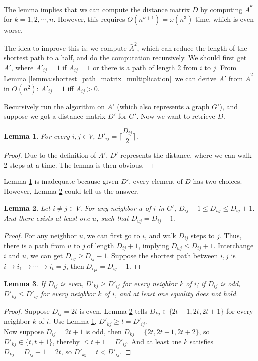 \documentclass[12pt]{article}
\theoremstyle{plain}
\newtheorem{lemma}{Lemma}[section]
\begin{document}
The lemma implies that we can compute the distance matrix $D$ by computing $\bar{A}^k$ for $k=1,2,\cdots,n$. However, this requires $O(n^{\nu+1})=\omega(n^3)$ time, which is even worse.

The idea to improve this is: we compute $\bar A^2$, which can reduce the length of the shortest path to a half, and do the computation recursively. We should first get $A'$, where $A'_{ij}=1$ if $A_{ij}=1$ or there is a path of length 2 from $i$ to $j$. From Lemma \ref{lemma:shortest_path_matrix_multiplication}, we can derive $A'$ from $\bar A^2$ in $O(n^2)$: $A'_{ij}=1$ iff $\bar A_{ij}>0$.

Recursively run the algorithm on $A'$ (which also represents a graph $G'$), and suppose we got a distance matrix $D'$ for $G'$. Now we want to retrieve $D$.

\begin{lemma}
\label{2}
For every $i,j\in V$, $D'_{ij}=\lceil\dfrac{D_{ij}}{2}\rceil$.
\end{lemma}
\begin{proof}
Due to the definition of $A'$, $D'$ represents the distance, where we can walk 2 steps at a time. The lemma is then obvious.
\end{proof}

Lemma \ref{2} is inadequate because given $D'$, every element of $D$ has two choices. However, Lemma \ref{3} could tell us the answer.
\begin{lemma}
\label{3}
Let $i\not=j \in V$. For any neighbor $u$ of $i$ in $G'$, $D_{ij}-1\le D_{uj}\le D_{ij}+1$. And there exists at least one $u$, such that $D_{uj}=D_{ij}-1$.
\end{lemma}
\begin{proof}
For any neighbor $u$, we can first go to $i$, and walk $D_{ij}$ steps to $j$. Thus, there is a path from $u$ to $j$ of length $D_{ij}+1$, implying $D_{uj}\le D_{ij}+1$. Interchange $i$ and $u$, we can get $D_{uj}\ge D_{ij}-1$. Suppose the shortest path between $i,j$ is $i\to i_1\to\cdots\to i_t=j$, then $D_{i_1j}=D_{ij}-1$.
\end{proof}

\begin{lemma}
\label{4}
If $D_{ij}$ is even, $D'_{kj}\ge D'_{ij}$ for every neighbor $k$ of $i$; if $D_{ij}$ is odd, $D'_{kj}\le D'_{ij}$ for every neighbor $k$ of $i$, and at least one equality does not hold.
\end{lemma}
\begin{proof}
Suppose $D_{ij}=2t$ is even. Lemma \ref{3} tells $D_{kj}\in\{2t-1,2t,2t+1\}$ for every neighbor $k$ of $i$. Use Lemma \ref{2}, $D'_{kj}\ge t=D'_{ij}$. \\
Now suppose $D_{ij}=2t+1$ is odd, then $D_{kj}=\{2t,2t+1,2t+2\}$, so $D'_{kj}\in \{t,t+1\}$, thereby $\le t+1=D'_{ij}$. And at least one $k$ satisfies $D_{kj}=D_{ij}-1=2t$, so $D'_{kj}=t<D'_{ij}$.
\end{proof}
\end{document}
